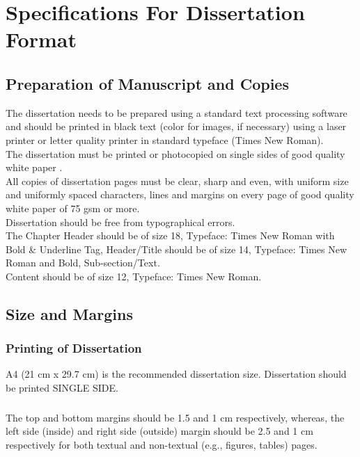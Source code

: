 \chapter{Specifications For Dissertation Format}

\section{Preparation of Manuscript and Copies }
The dissertation needs to be prepared using a standard text processing software and should be printed in black text (color for images, if necessary) using a laser printer or letter quality printer in standard typeface (Times New Roman).\\
The dissertation must be printed or photocopied on single sides of good quality white paper \cite{atzori2010}.\\

All copies of dissertation pages must be clear, sharp and even, with uniform size and uniformly spaced characters, lines and margins on every page of good quality white paper of 75 gsm or more\cite{bakshicisco}.\\
 
Dissertation should be free from typographical errors.\\

The Chapter Header should be of size 18, Typeface: Times New Roman with Bold \& Underline Tag, Header/Title should be of size 14, Typeface: Times New Roman and Bold, Sub-section/Text\cite{flexisecjinwala2012}.\\ 

Content should be of size 12, Typeface: Times New Roman.

\section{Size and Margins}
\subsection{Printing of Dissertation}
A4 (21 cm x 29.7 cm) is the recommended dissertation size. Dissertation should be printed SINGLE SIDE\cite{tinyseckarlof2004}. 
\subsection{}
The top and bottom margins should be 1.5 and 1 cm respectively, whereas, the left side (inside) and right side (outside) margin should be 2.5 and 1 cm respectively for both textual and non-textual (e.g., figures, tables) pages. 
